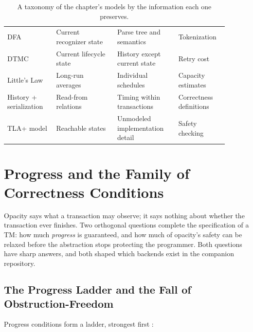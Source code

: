 \begin{table}[htbp]
\centering
\begin{tabular}{M{0.20\linewidth}M{0.25\linewidth}M{0.25\linewidth}M{0.20\linewidth}}
\hline
{} &  &  &  \\
\hline
DFA & Current recognizer state & Parse tree and semantics & Tokenization \\
DTMC & Current lifecycle state & History except current state & Retry cost \\
Little's Law & Long-run averages & Individual schedules & Capacity estimates \\
History + serialization & Read-from relations & Timing within transactions & Correctness definitions \\
TLA+ model & Reachable states & Unmodeled implementation detail & Safety checking \\
\hline
\end{tabular}
\caption{A taxonomy of the chapter's models by the information each one preserves.}
\label{tab:model-taxonomy}
\end{table}

\section{Progress and the Family of Correctness Conditions}
\label{sec:progress-semantics}

Opacity says what a transaction may observe; it says nothing about whether
the transaction ever finishes. Two orthogonal questions complete the
specification of a TM: how much \emph{progress} is guaranteed, and how much
of opacity's safety can be relaxed before the abstraction stops protecting
the programmer. Both questions have sharp answers, and both shaped which
backends exist in the companion repository.

\subsection{The Progress Ladder and the Fall of Obstruction-Freedom}
\label{sec:progress-ladder}

Progress conditions form a ladder, strongest first
\cite{herlihy91,guerraoui10principles}:


